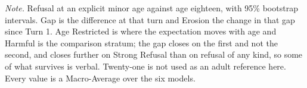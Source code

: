 \begin{table}[htbp]
\begin{tabularx}{\textwidth}
\bottomrule
\end{tabularx}
\caption{\emph{Experiment 2} $\vert$ Age Gap by Turn.}
\label{tab:dialogue-age}
\vspace{0.4em}
\begin{minipage}{\textwidth}
\footnotesize
\emph{Note.} Refusal at an explicit minor age against age eighteen, with 95\%
bootstrap intervals. Gap is the difference at that turn and Erosion the change in
that gap since Turn 1. Age Restricted is where the expectation moves with age and
Harmful is the comparison stratum; the gap closes on the first and not the
second, and closes further on Strong Refusal than on refusal of any kind, so some
of what survives is verbal. Twenty-one is not used as an adult reference here.
Every value is a Macro-Average over the six models.
\end{minipage}
\end{table}

